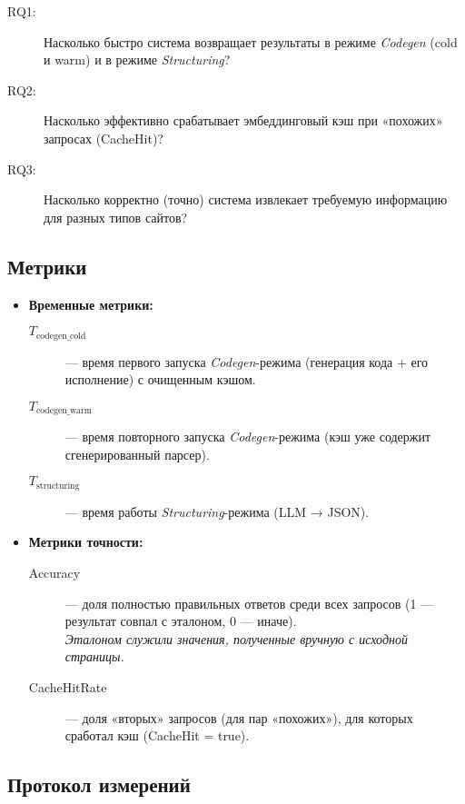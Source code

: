 \begin{description}
    \item[RQ1:] Насколько быстро система возвращает результаты в режиме \emph{Codegen} (cold и warm) и в режиме \emph{Structuring}?
    \item[RQ2:] Насколько эффективно срабатывает эмбеддинговый кэш при «похожих» запросах (CacheHit)?
    \item[RQ3:] Насколько корректно (точно) система извлекает требуемую информацию для разных типов сайтов?
\end{description}

\subsection{Метрики}

\begin{itemize}
    \item \textbf{Временные метрики:}
    \begin{description}
        \item[$T_{\text{codegen\_cold}}$] — время первого запуска \emph{Codegen}-режима (генерация кода + его исполнение) с очищенным кэшом.
        \item[$T_{\text{codegen\_warm}}$] — время повторного запуска \emph{Codegen}-режима (кэш уже содержит сгенерированный парсер).
        \item[$T_{\text{structuring}}$] — время работы \emph{Structuring}-режима (LLM → JSON).
    \end{description}
    \item \textbf{Метрики точности:}
    \begin{description}
        \item[Accuracy] — доля полностью правильных ответов среди всех запросов (1 — результат совпал с эталоном, 0 — иначе). \\
        \emph{Эталоном служили значения, полученные вручную с исходной страницы.}
        \item[CacheHitRate] — доля «вторых» запросов (для пар «похожих»), для которых сработал кэш (CacheHit = true).
    \end{description}
\end{itemize}

\subsection{Протокол измерений}


